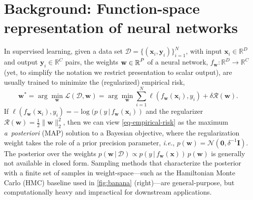 \documentclass{article}
\makeatletter
\newcommand{\ie}{\textit{i.e.\@}\xspace}
\newcommand{\dataset}{\ensuremath{\mathcal{D}}}
\newcommand{\inputDomain}{\ensuremath{\mathbb{R}^{D}}}
\newcommand{\outputDomain}{\ensuremath{\mathbb{R}^{C}}}
\newcommand{\weights}{\ensuremath{\mathbf{w}}}
\newcommand{\mbf}[1]{\mathbf{#1}}
\renewcommand{\mid}{\,|\,}
\newcommand{\MI}{\mbf{I}}
\newcommand{\vzeros}{\mbf{0}}
\newcommand{\vx}{\mbf{x}}
\newcommand{\vy}{\mbf{y}}
\newcommand{\vw}{\mbf{w}}
\newcommand{\Norm}{\mathcal{N}}
\makeatother
\begin{document}
\section{Background: Function-space representation of neural networks}
\label{sec:methods}
%

%
In supervised learning, given a data set $\dataset = \{(\vx_{i} , \vy_{i})\}_{i=1}^{N}$, with input $\vx_i \in \inputDomain$ and output $\vy_i \in \outputDomain$ pairs, the weights $\weights \in \R^{P}$ of a neural network, $f_\mathbf{w}: \inputDomain \to \outputDomain$ (yet, to simplify the notation we restrict presentation to scalar output), are usually trained to minimize the (regularized) empirical risk,
%
\begin{equation} \label{eq-empirical-risk}
  \weights^{*} = 
  \arg \min_{\weights} \mathcal{L}(\dataset,\weights) =
  \arg \min_{\weights} \textstyle\sum_{i=1}^{N} \ell(f_\weights(\mathbf{x}_{i}), y_i) + \delta \mathcal{R}(\weights).
\end{equation}
%
If $\ell(f_\weights(\vx_{i}), y_i) = -\log(p(y \mid f_\weights(\vx_{i}))$ and the regularizer $\mathcal{R}(\weights) = \frac{1}{2}\|\weights\|^{2}_2$, then we can view \cref{eq-empirical-risk} as the maximum {\it a~posteriori} (MAP) solution to a Bayesian objective, where the regularization weight takes the role of a prior precision parameter, \ie, $p(\vw) = \Norm(\vzeros, \delta^{-1} \MI)$.
The posterior over the weights ${p(\vw \mid \dataset) \propto p(y \mid f_{\weights}(\vx)) \, p(\weights)}$ is generally not available in closed form. Sampling methods that characterize the posterior with a finite set of samples in weight-space---such as the Hamiltonian Monte Carlo (HMC) baseline used in \cref{fig:banana} (right)---are general-purpose, but computationally heavy and impractical for downstream applications.
\end{document}
